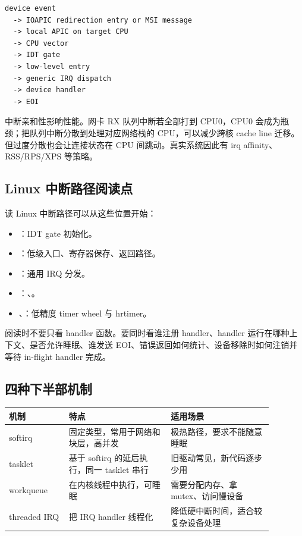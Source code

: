 \begin{lstlisting}
device event
  -> IOAPIC redirection entry or MSI message
  -> local APIC on target CPU
  -> CPU vector
  -> IDT gate
  -> low-level entry
  -> generic IRQ dispatch
  -> device handler
  -> EOI
\end{lstlisting}

中断亲和性影响性能。网卡 RX 队列中断若全部打到 CPU0，CPU0 会成为瓶颈；把队列中断分散到处理对应网络栈的 CPU，可以减少跨核 cache line 迁移。但过度分散也会让连接状态在 CPU 间跳动。真实系统因此有 irq affinity、RSS/RPS/XPS 等策略。

\subsection{Linux 中断路径阅读点}

读 Linux 中断路径可以从这些位置开始：

\begin{itemize}
\tightlist
\item {}：IDT gate 初始化。
\item {}：低级入口、寄存器保存、返回路径。
\item {}：通用 IRQ 分发。
\item {}：、。
\item {}、：低精度 timer wheel 与 hrtimer。
\end{itemize}

阅读时不要只看 handler 函数。要同时看谁注册 handler、handler 运行在哪种上下文、是否允许睡眠、谁发送 EOI、错误返回如何统计、设备移除时如何注销并等待 in-flight handler 完成。

\subsection{四种下半部机制}

\begin{longtable}{p{0.2\linewidth}p{0.34\linewidth}p{0.34\linewidth}}
\toprule
机制 & 特点 & 适用场景 \\
\midrule
softirq & 固定类型，常用于网络和块层，高并发 & 极热路径，要求不能随意睡眠 \\
tasklet & 基于 softirq 的延后执行，同一 tasklet 串行 & 旧驱动常见，新代码逐步少用 \\
workqueue & 在内核线程中执行，可睡眠 & 需要分配内存、拿 mutex、访问慢设备 \\
threaded IRQ & 把 IRQ handler 线程化 & 降低硬中断时间，适合较复杂设备处理 \\
\bottomrule
\end{longtable}

